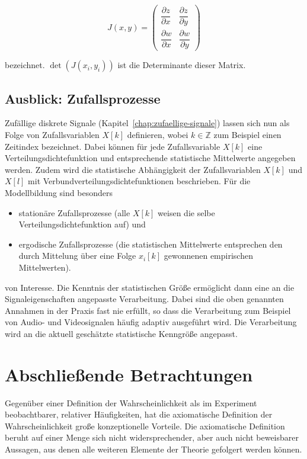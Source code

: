 $$
J(x,y) = \begin{pmatrix} \dfrac{\partial z}{\partial x} & \dfrac{\partial z}{\partial y} \\[6pt] \dfrac{\partial w}{\partial x} & \dfrac{\partial w}{\partial y} \end{pmatrix}
$$

bezeichnet. $\det(J(x_i, y_i))$ ist die Determinante dieser Matrix.

\subsection{Ausblick: Zufallsprozesse}
\label{sec:zufallsprozesse}

Zufällige diskrete Signale (Kapitel~\ref{chap:zufaellige-signale}) lassen sich nun als Folge von Zufallsvariablen $X[k]$ definieren, wobei $k \in \mathbb{Z}$ zum Beispiel einen Zeitindex bezeichnet. Dabei können für jede Zufallsvariable $X[k]$ eine Verteilungsdichtefunktion und entsprechende statistische Mittelwerte angegeben werden. Zudem wird die statistische Abhängigkeit der Zufallsvariablen $X[k]$ und $X[l]$ mit Verbundverteilungsdichtefunktionen beschrieben. Für die Modellbildung sind besonders

\begin{itemize}
  \item stationäre Zufallsprozesse (alle $X[k]$ weisen die selbe Verteilungsdichtefunktion auf) und
  \item ergodische Zufallsprozesse (die statistischen Mittelwerte entsprechen den durch Mittelung über eine Folge $x_i[k]$ gewonnenen empirischen Mittelwerten).
\end{itemize}

von Interesse. Die Kenntnis der statistischen Größe ermöglicht dann eine an die Signaleigenschaften angepasste Verarbeitung. Dabei sind die oben genannten Annahmen in der Praxis fast nie erfüllt, so dass die Verarbeitung zum Beispiel von Audio- und Videosignalen häufig adaptiv ausgeführt wird. Die Verarbeitung wird an die aktuell geschätzte statistische Kenngröße angepasst.


\section{Abschließende Betrachtungen}
\label{sec:wahrscheinlichkeit-abschluss}

Gegenüber einer Definition der Wahrscheinlichkeit als im Experiment beobachtbarer, relativer Häufigkeiten, hat die axiomatische Definition der Wahrscheinlichkeit große konzeptionelle Vorteile. Die axiomatische Definition beruht auf einer Menge sich nicht widersprechender, aber auch nicht beweisbarer Aussagen, aus denen alle weiteren Elemente der Theorie gefolgert werden können.

